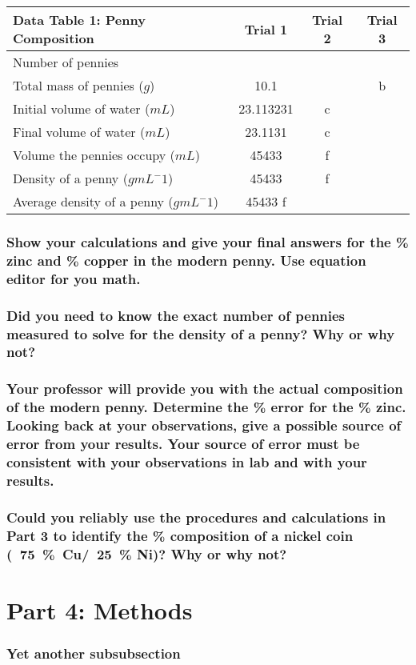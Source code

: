 \documentclass[a4paper,10pt]{article}
\begin{document}
        \begin{table}[h!]
            \label{tab:table1}
            \begin{tabular}{|l|c|c|c|}
                \hline
                \textbf{Data Table 1: Penny Composition} & \textbf{Trial 1} & \textbf{Trial 2} & \textbf{Trial 3}\\
                \hline
                Number of pennies & & & \\
                \hline
                Total mass of pennies ($g$) & 10.1 & & b \\
                \hline
                Initial volume of water ($mL$) & 23.113231 & c & \\
                \hline
                Final volume of water ($mL$) & 23.1131 & c & \\
                \hline
                Volume the pennies occupy ($mL$) & 45433 & f & \\
                \hline
                Density of a penny ($g mL^-1$) & 45433 & f & \\
                \hline
                Average density of a penny ($g mL^-1$) & 45433  f &&\\
                \hline
            \end{tabular}
        \end{table}

        \subsubsection{Show your calculations and give your final answers for the \% zinc and \% copper in the modern penny. Use equation editor for you math.}

        \subsubsection{Did you need to know the exact number of pennies measured to solve for the density of a penny? Why or why not?}

        \subsubsection{Your professor will provide you with the actual composition of the modern penny. Determine the \% error for the \% zinc. Looking back at your observations, give a possible source of error from your results. Your source of error must be consistent with your observations in lab and with your results.}

        \subsubsection{Could you reliably use the procedures and calculations in Part 3 to identify the \% composition of a nickel coin (~75~\%~Cu/~25~\% Ni)? Why or why not?}

    \section{Part 4: Methods}
        \subsubsection{Yet another subsubsection}
\end{document}
